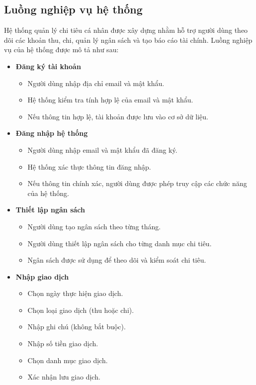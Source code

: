 \documentclass[12pt,letterpaper]{article}
\begin{document}
\subsection{Luồng nghiệp vụ hệ thống}

Hệ thống quản lý chi tiêu cá nhân được xây dựng nhằm hỗ trợ người dùng theo dõi các khoản thu, chi, quản lý ngân sách và tạo báo cáo tài chính. Luồng nghiệp vụ của hệ thống được mô tả như sau:

\begin{itemize}

\item \textbf{Đăng ký tài khoản}
\begin{itemize}
\item Người dùng nhập địa chỉ email và mật khẩu.
\item Hệ thống kiểm tra tính hợp lệ của email và mật khẩu.
\item Nếu thông tin hợp lệ, tài khoản được lưu vào cơ sở dữ liệu.
\end{itemize}

\item \textbf{Đăng nhập hệ thống}
\begin{itemize}
\item Người dùng nhập email và mật khẩu đã đăng ký.
\item Hệ thống xác thực thông tin đăng nhập.
\item Nếu thông tin chính xác, người dùng được phép truy cập các chức năng của hệ thống.
\end{itemize}

\item \textbf{Thiết lập ngân sách}
\begin{itemize}
\item Người dùng tạo ngân sách theo từng tháng.
\item Người dùng thiết lập ngân sách cho từng danh mục chi tiêu.
\item Ngân sách được sử dụng để theo dõi và kiểm soát chi tiêu.
\end{itemize}

\item \textbf{Nhập giao dịch}
\begin{itemize}
\item Chọn ngày thực hiện giao dịch.
\item Chọn loại giao dịch (thu hoặc chi).
\item Nhập ghi chú (không bắt buộc).
\item Nhập số tiền giao dịch.
\item Chọn danh mục giao dịch.
\item Xác nhận lưu giao dịch.
\end{itemize}


\end{itemize}
\end{document}
